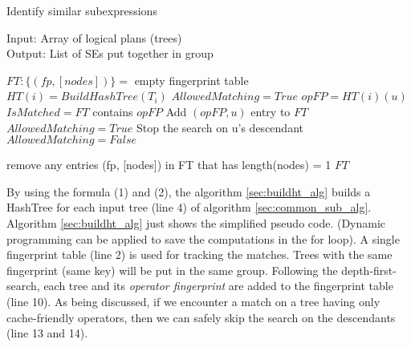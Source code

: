 \begin{algorithm}
\caption{Identify similar subexpressions}\label{sec:common_sub_alg}
Input: Array of logical plans (trees)\\
Output: List of SEs put together in group
\begin{algorithmic}[1]
\State $FT:\{(fp, [nodes])\} =$ empty fingerprint table
	\State$HT(i) = BuildHashTree(T_{i})$
	\State $AllowedMatching = True$	
		\State $opFP = HT(i)(u)$
		\State $IsMatched = FT$ contains $opFP$
				\State Add $(opFP, u)$ entry to $FT$
		\EndIf
		\State $AllowedMatching = True$	
			\State Stop the search on u's descendant
			\State $AllowedMatching = False$	
		\EndIf		
	\EndFor
	
\EndFor
\State remove any entries (fp, [nodes]) in FT that has length(nodes) = 1
\State \Return  $FT$
\EndProcedure
\end{algorithmic}
\end{algorithm}

By using the formula (1) and (2), the algorithm \ref{sec:buildht_alg} builds a HashTree for each input tree (line 4) of algorithm \ref{sec:common_sub_alg}. Algorithm \ref{sec:buildht_alg} just shows the simplified pseudo code. (Dynamic programming can be applied to save the computations in the for loop). A single fingerprint table (line 2) is used for tracking the matches. Trees with the same fingerprint (same key) will be put in the same group. Following the depth-first-search, each tree and its \emph{operator fingerprint} are added to the fingerprint table (line 10). As being discussed, if we encounter a match on a tree having only cache-friendly operators, then we can safely skip the search on the descendants (line 13 and 14).